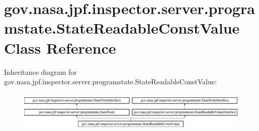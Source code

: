 \hypertarget{classgov_1_1nasa_1_1jpf_1_1inspector_1_1server_1_1programstate_1_1_state_readable_const_value}{}\section{gov.\+nasa.\+jpf.\+inspector.\+server.\+programstate.\+State\+Readable\+Const\+Value Class Reference}
\label{classgov_1_1nasa_1_1jpf_1_1inspector_1_1server_1_1programstate_1_1_state_readable_const_value}
Inheritance diagram for gov.\+nasa.\+jpf.\+inspector.\+server.\+programstate.\+State\+Readable\+Const\+Value\+:\begin{figure}[H]
\begin{center}
\leavevmode
\includegraphics[height=1.944444cm]{classgov_1_1nasa_1_1jpf_1_1inspector_1_1server_1_1programstate_1_1_state_readable_const_value}
\end{center}
\end{figure}
